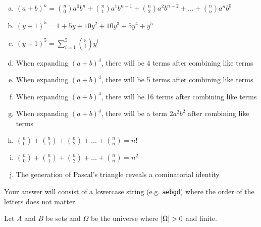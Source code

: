 \documentclass[12pt,landscape]{article}
\newcommand{\instr}{\small Your answer will consist of a lowercase string (e.g. \texttt{aebgd}) where the order of the letters does not matter. \normalsize}
\begin{document}
\vspace{-0.2cm}\benum{} 
\begin{enumerate}[(a)]
\item $(a + b)^n = \binom{n}{0} a^0 b^n + \binom{n}{1} a^1 b^{n-1} + \binom{n}{2} a^2 b^{n-2} + \ldots + \binom{n}{n} a^n b^0$

\item $(y+1)^5 = 1 + 5y + 10y^2 + 10y^3 + 5y^4 + y^5$
\item $(y+1)^5 = \sum_{i=1}^5 \binom{5}{i} y^i$

\item When expanding $(a + b)^4$, there will be 4 terms after combining like terms
\item When expanding $(a + b)^4$, there will be 5 terms after combining like terms
\item When expanding $(a + b)^4$, there will be 16 terms after combining like terms
\item When expanding $(a + b)^4$, there will be a term $2a^2 b^2$ after combining like terms

\item $\binom{n}{0} + \binom{n}{1} + \binom{n}{2} + \ldots + \binom{n}{n} = n!$
\item $\binom{n}{0} + \binom{n}{1} + \binom{n}{2} + \ldots + \binom{n}{n} = n^2$

\item The generation of Pascal's triangle reveals a cominatorial identity
\end{enumerate}
\eenum\instr\pagebreak


\problem{} Let $A$ and $B$ be sets and $\Omega$ be the universe where $\abss{\Omega}> 0$ and finite.
\end{document}

